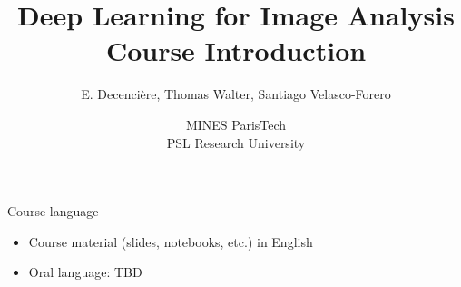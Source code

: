 \documentclass[xcolor=pdftex,dvipsnames,table,mathserif]{beamer}
\title{Deep Learning for Image Analysis\\Course Introduction}
\author{E. Decencière, Thomas Walter, Santiago Velasco-Forero}
\date{MINES ParisTech\\
  PSL Research University
}
\begin{document}
\begin{frame}
\titlepage
\end{frame}

\begin{frame}{Course language}

\begin{itemize}
\item Course material (slides, notebooks, etc.) in English
\item Oral language: TBD
\end{itemize}

\end{frame}



\end{document}
